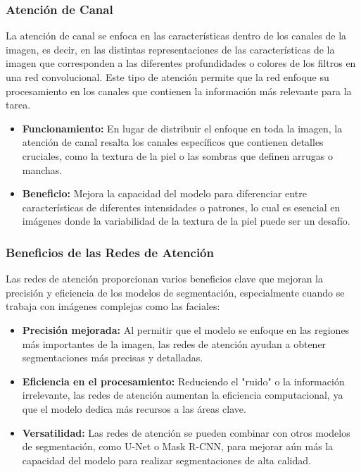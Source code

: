 \subsubsection{Atención de Canal}  
La atención de canal se enfoca en las características dentro de los canales de la imagen, es decir, en las distintas representaciones de las características de la imagen que corresponden a las diferentes profundidades o colores de los filtros en una red convolucional. Este tipo de atención permite que la red enfoque su procesamiento en los canales que contienen la información más relevante para la tarea.  
\begin{itemize}
    \item \textbf{Funcionamiento:} En lugar de distribuir el enfoque en toda la imagen, la atención de canal resalta los canales específicos que contienen detalles cruciales, como la textura de la piel o las sombras que definen arrugas o manchas.
    \item \textbf{Beneficio:} Mejora la capacidad del modelo para diferenciar entre características de diferentes intensidades o patrones, lo cual es esencial en imágenes donde la variabilidad de la textura de la piel puede ser un desafío. \parencite{autor2019canal}
\end{itemize}

\subsubsection{Beneficios de las Redes de Atención}  
Las redes de atención proporcionan varios beneficios clave que mejoran la precisión y eficiencia de los modelos de segmentación, especialmente cuando se trabaja con imágenes complejas como las faciales:
\begin{itemize}
    \item \textbf{Precisión mejorada:} Al permitir que el modelo se enfoque en las regiones más importantes de la imagen, las redes de atención ayudan a obtener segmentaciones más precisas y detalladas.
    \item \textbf{Eficiencia en el procesamiento:} Reduciendo el "ruido" o la información irrelevante, las redes de atención aumentan la eficiencia computacional, ya que el modelo dedica más recursos a las áreas clave.
    \item \textbf{Versatilidad:} Las redes de atención se pueden combinar con otros modelos de segmentación, como U-Net o Mask R-CNN, para mejorar aún más la capacidad del modelo para realizar segmentaciones de alta calidad. \parencite{autor2021beneficios}
\end{itemize}

